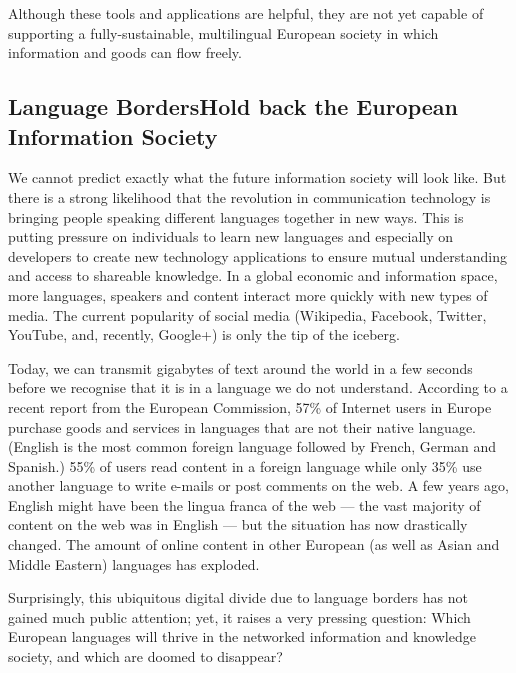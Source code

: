 \documentclass[]{../metanetpaper}
\begin{document}
\begin{multicols}{2}
Although these tools and applications are helpful, they are not yet capable of supporting a fully-sustainable, multilingual European society in which information and goods can flow freely.

\subsection[Language Borders Hold back the European Information Society]{Language Borders\newline Hold back the European Information Society}

We cannot predict exactly what the future information society will look like. But there is a strong likelihood that the revolution in communication technology is bringing people speaking different languages together in new ways. This is putting pressure on individuals to learn new languages and especially on developers to create new technology applications to ensure mutual understanding and access to shareable knowledge. In a global economic and information space, more languages, speakers and content interact more quickly with new types of media. The current popularity of social media (Wikipedia, Facebook, Twitter, YouTube, and, recently, Google+) is only the tip of the iceberg.


Today, we can transmit gigabytes of text around the world in a few seconds before we recognise that it is in a language we do not understand. According to a recent report from the European Commission, 57\% of Internet users in Europe purchase goods and services in languages that are not their native language. (English is the most common foreign language followed by French, German and Spanish.) 55\% of users read content in a foreign language while only 35\% use another language to write e-mails or post comments on the web\cite{EC1}. A few years ago, English might have been the lingua franca of the web — the vast majority of content on the web was in English — but the situation has now drastically changed. The amount of online content in other European (as well as Asian and Middle Eastern) languages has exploded.

Surprisingly, this ubiquitous digital divide due to language borders has not gained much public attention; yet, it raises a very pressing question: Which European languages will thrive in the networked information and knowledge society, and which are doomed to disappear?


\end{multicols}
\end{document}

